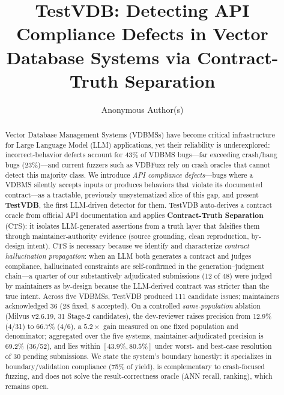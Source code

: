 \documentclass[sigconf]{acmart}
\begin{document}
\title{TestVDB: Detecting API Compliance Defects in Vector Database Systems via Contract-Truth Separation}

\author{Anonymous Author(s)}



\begin{abstract}
Vector Database Management Systems (VDBMSs) have become critical infrastructure for Large Language Model (LLM) applications, yet their reliability is underexplored: incorrect-behavior defects account for 43\% of VDBMS bugs---far exceeding crash/hang bugs (23\%)---and current fuzzers such as VDBFuzz rely on crash oracles that cannot detect this majority class. We introduce \emph{API compliance defects}---bugs where a VDBMS silently accepts inputs or produces behaviors that violate its documented contract---as a tractable, previously unsystematized slice of this gap, and present \textbf{TestVDB}, the first LLM-driven detector for them. TestVDB auto-derives a contract oracle from official API documentation and applies \textbf{Contract-Truth Separation} (CTS): it isolates LLM-generated assertions from a truth layer that falsifies them through maintainer-authority evidence (source grounding, clean reproduction, by-design intent). CTS is necessary because we identify and characterize \emph{contract hallucination propagation}: when an LLM both generates a contract and judges compliance, hallucinated constraints are self-confirmed in the generation--judgment chain---a quarter of our substantively adjudicated submissions (12 of 48) were judged by maintainers as by-design because the LLM-derived contract was stricter than the true intent. Across five VDBMSs, TestVDB produced 111 candidate issues; maintainers acknowledged 36 (28 fixed, 8 accepted). On a controlled \emph{same-population} ablation (Milvus v2.6.19, 31 Stage-2 candidates), the dev-reviewer raises precision from 12.9\% (4/31) to 66.7\% (4/6), a $5.2\times$ gain measured on one fixed population and denominator; aggregated over the five systems, maintainer-adjudicated precision is 69.2\% (36/52), and lies within $[43.9\%, 80.5\%]$ under worst- and best-case resolution of 30 pending submissions. We state the system's boundary honestly: it specializes in boundary/validation compliance (75\% of yield), is complementary to crash-focused fuzzing, and does not solve the result-correctness oracle (ANN recall, ranking), which remains open.
\end{abstract}
\end{document}
